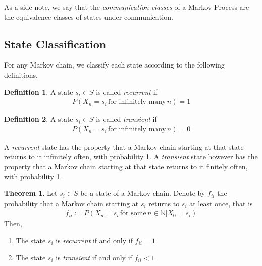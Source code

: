 \documentclass[a4paper,12pt]{article}
\theoremstyle{definition}
\newtheorem{definition}{Definition}[subsection]
\newtheorem{theorem}{Theorem}[subsection]
\newcommand{\N}{\mathbb{N}}
\begin{document}
	As a side note, we say that the \emph{communication classes} of a Markov Process are the equivalence classes of states under communication.
	\newpage	

	\subsection{State Classification}
	
	For any Markov chain, we classify each state according to the following definitions.
	\begin{definition}
		A state $s_i \in S$ is called \emph{recurrent} if 
		\begin{equation*}
			\begin{aligned}
				P(X_n = s_i \, \text{for infinitely many} \, n) = 1
			\end{aligned}
		\end{equation*}
	\end{definition}
	\begin{definition}
		A state $s_i \in S$ is called \emph{transient} if 
		\begin{equation*}
			\begin{aligned}
				P(X_n = s_i \, \text{for infinitely many} \, n) = 0
			\end{aligned}
		\end{equation*}
	\end{definition}

	A \emph{recurrent} state has the property that a Markov chain starting at that state returns to it infinitely often, with probability 1.
	A \emph{transient} state however has the property that a Markov chain starting at that state returns to it finitely often, with probability 1.

	\begin{theorem}
		Let $s_i \in S$ be a state of a Markov chain. Denote by $f_{ii}$ the probability that a Markov chain starting at $s_i$ returns to 
		$s_i$ at least once, that is
		\begin{equation*}
			\begin{aligned}
				f_{ii} := P(X_n = s_i \, \text{for some} \, n \in \N | X_0 = s_i)
			\end{aligned}
		\end{equation*}
		Then,
		\begin{enumerate}
			\item The state $s_i$ is \emph{recurrent} if and only if $f_{ii} = 1$
			\item The state $s_i$ is \emph{transient} if and only if $f_{ii} < 1$
		\end{enumerate}
	\end{theorem}
\end{document}
